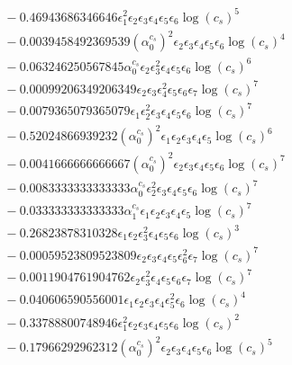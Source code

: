 \documentclass[10pt]{article}
\begin{document}
\begin{align*}
&{}  - 0.46943686346646 \epsilon_{1}^{2} \epsilon_{2} \epsilon_{3} \epsilon_{4} \epsilon_{5} \epsilon_{6} \log{\left(c_{s} \right)}^{5} \\
&{}  - 0.0039458492369539 \left(\alpha_{0}^{c_s}\right)^{2} \epsilon_{2} \epsilon_{3} \epsilon_{4} \epsilon_{5} \epsilon_{6} \log{\left(c_{s} \right)}^{4} \\
&{}  - 0.063246250567845 \alpha_{0}^{c_s} \epsilon_{2} \epsilon_{3}^{2} \epsilon_{4} \epsilon_{5} \epsilon_{6} \log{\left(c_{s} \right)}^{6} \\
&{}  - 0.00099206349206349 \epsilon_{2} \epsilon_{3} \epsilon_{4}^{2} \epsilon_{5} \epsilon_{6} \epsilon_{7} \log{\left(c_{s} \right)}^{7} \\
&{}  - 0.0079365079365079 \epsilon_{1} \epsilon_{2}^{2} \epsilon_{3} \epsilon_{4} \epsilon_{5} \epsilon_{6} \log{\left(c_{s} \right)}^{7} \\
&{}  - 0.52024866939232 \left(\alpha_{0}^{c_s}\right)^{2} \epsilon_{1} \epsilon_{2} \epsilon_{3} \epsilon_{4} \epsilon_{5} \log{\left(c_{s} \right)}^{6} \\
&{}  - 0.0041666666666667 \left(\alpha_{0}^{c_s}\right)^{2} \epsilon_{2} \epsilon_{3} \epsilon_{4} \epsilon_{5} \epsilon_{6} \log{\left(c_{s} \right)}^{7} \\
&{}  - 0.0083333333333333 \alpha_{0}^{c_s} \epsilon_{2}^{2} \epsilon_{3} \epsilon_{4} \epsilon_{5} \epsilon_{6} \log{\left(c_{s} \right)}^{7} \\
&{}  - 0.033333333333333 \alpha_{1}^{c_s} \epsilon_{1} \epsilon_{2} \epsilon_{3} \epsilon_{4} \epsilon_{5} \log{\left(c_{s} \right)}^{7} \\
&{}  - 0.26823878310328 \epsilon_{1} \epsilon_{2} \epsilon_{3}^{2} \epsilon_{4} \epsilon_{5} \epsilon_{6} \log{\left(c_{s} \right)}^{3} \\
&{}  - 0.00059523809523809 \epsilon_{2} \epsilon_{3} \epsilon_{4} \epsilon_{5} \epsilon_{6}^{2} \epsilon_{7} \log{\left(c_{s} \right)}^{7} \\
&{}  - 0.0011904761904762 \epsilon_{2} \epsilon_{3}^{2} \epsilon_{4} \epsilon_{5} \epsilon_{6} \epsilon_{7} \log{\left(c_{s} \right)}^{7} \\
&{}  - 0.040606590556001 \epsilon_{1} \epsilon_{2} \epsilon_{3} \epsilon_{4} \epsilon_{5}^{2} \epsilon_{6} \log{\left(c_{s} \right)}^{4} \\
&{}  - 0.33788800748946 \epsilon_{1}^{2} \epsilon_{2} \epsilon_{3} \epsilon_{4} \epsilon_{5} \epsilon_{6} \log{\left(c_{s} \right)}^{2} \\
&{}  - 0.17966292962312 \left(\alpha_{0}^{c_s}\right)^{2} \epsilon_{2} \epsilon_{3} \epsilon_{4} \epsilon_{5} \epsilon_{6} \log{\left(c_{s} \right)}^{5} \\

\end{align*}
\end{document}
